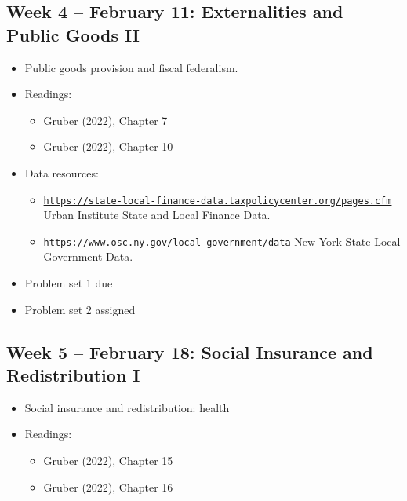 \documentclass[11pt]{article}
\begin{document}
\subsection*{Week 4 -- February 11: Externalities and Public Goods II}
\begin{itemize}
    \setlength{\itemsep}{0em}
    \item Public goods provision and fiscal federalism.
    \item Readings:
    \begin{itemize}
        \item Gruber (2022), Chapter 7
        \item Gruber (2022), Chapter 10
    \end{itemize}
    \item Data resources:
    \begin{itemize}
    \setlength{\itemsep}{0em}
    \item \href{https://state-local-finance-data.taxpolicycenter.org/pages.cfm}{\nolinkurl{https://state-local-finance-data.taxpolicycenter.org/pages.cfm}} Urban Institute State and Local Finance Data.
    \item \href{https://www.osc.ny.gov/local-government/data}{\nolinkurl{https://www.osc.ny.gov/local-government/data}} New York State Local Government Data.
    \end{itemize}
    \item Problem set 1 due
    \item Problem set 2 assigned
\end{itemize}

\subsection*{Week 5 -- February 18: Social Insurance and Redistribution I}
\begin{itemize}
    \setlength{\itemsep}{0em}
    \item Social insurance and redistribution: health
    \item Readings:
    \begin{itemize}
        \item Gruber (2022), Chapter 15
        \item Gruber (2022), Chapter 16
    \end{itemize}
\end{itemize}
\end{document}
